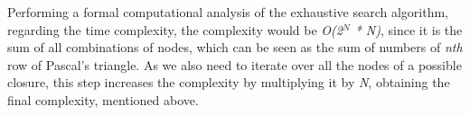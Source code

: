 \documentclass[...]{revdetua}
\begin{document}
Performing a formal computational analysis of the exhaustive search algorithm, regarding the time complexity, the complexity would be \textit{O(2$^N$ * N)}, since it is the sum of all combinations of nodes, which can be seen as the sum of numbers of \textit{nth} row of Pascal's triangle. As we also need to iterate over all the nodes of a possible closure, this step increases the complexity by multiplying it by \textit{N}, obtaining the final complexity, mentioned above.

\newpage

\begin{figure}[htp]
\centering 





\end{figure}
\end{document}
